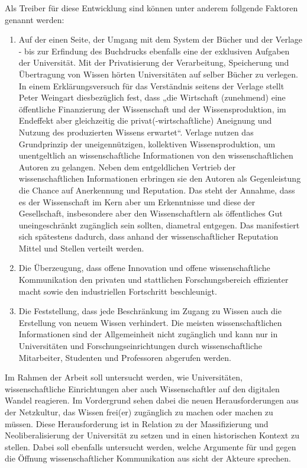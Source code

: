 Als Treiber für diese Entwicklung sind können unter anderem follgende Faktoren genannt werden: 
\begin{enumerate}
\item Auf der einen Seite, der Umgang mit dem System der Bücher und der Verlage - bis zur Erfindung des Buchdrucks ebenfalls eine der exklusiven Aufgaben der Universität. Mit der Privatisierung der Verarbeitung, Speicherung und Übertragung von Wissen hörten Universitäten auf selber Bücher zu verlegen. In einem Erklärungsversuch für das Verständnis seitens der Verlage stellt Peter Weingart diesbezüglich fest, dass „die Wirtschaft (zunehmend) eine öffentliche Finanzierung der Wissenschaft und der Wissensproduktion, im Endeffekt aber gleichzeitig die privat(-wirtschaftliche) Aneignung und Nutzung des produzierten Wissens erwartet“\cite{cite:2}. Verlage nutzen das Grundprinzip der uneigennützigen, kollektiven Wissensproduktion, um unentgeltlich an wissenschaftliche Informationen von den wissenschaftlichen Autoren zu gelangen. Neben dem entgeldlichen Vertrieb der wissenschaftlichen Informationen erbringen sie den Autoren als Gegenleistung die Chance auf Anerkennung und Reputation. Das steht der Annahme, dass es der Wissenschaft im Kern aber um Erkenntnisse und diese der Gesellschaft, insbesondere aber den Wissenschaftlern als öffentliches Gut uneingeschränkt zugänglich sein sollten\cite{hanekop_2006}, diametral entgegen. Das manifestiert sich spätestens dadurch, dass anhand der wissenschaftlicher Reputation Mittel und Stellen verteilt werden\cite{cite:4}.
\item Die Überzeugung, dass offene Innovation und offene wissenschaftliche Kommunikation den privaten und stattlichen Forschungsbereich effizienter macht sowie den industriellen Fortschritt beschleunigt\cite{cite:7}.
\item Die Feststellung, dass jede Beschränkung im Zugang zu Wissen auch die Erstellung von neuem Wissen verhindert\cite{cite:5}\cite{cite:8}.  Die meisten wissenschaftlichen Informationen sind der Allgemeinheit nicht zugänglich und kann nur in Universitäten und Forschungseinrichtungen durch wissenschaftliche Mitarbeiter, Studenten und Professoren abgerufen werden\cite{cite:6}. 
\end{enumerate}	

Im Rahmen der Arbeit soll untersucht werden, wie Universitäten, wissenschaftliche Einrichtungen aber auch Wissenschaftler auf den digitalen Wandel reagieren. Im Vordergrund sehen dabei die neuen Herausforderungen aus der Netzkultur, das Wissen frei(er) zugänglich zu machen oder machen zu müssen. Diese Herausforderung ist in Relation zu der Massifizierung und Neoliberalisierung der Universität zu setzen und in einen historischen Kontext zu stellen. Dabei soll ebenfalls untersucht werden, welche Argumente für und gegen die Öffnung wissenschaftlicher Kommunikation aus sicht der Akteure sprechen.

